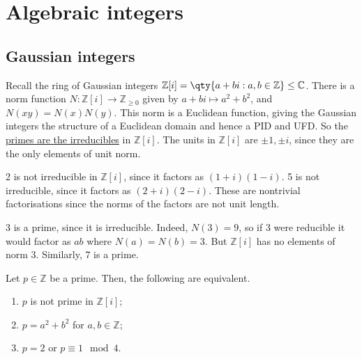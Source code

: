 \section{Algebraic integers}

\subsection{Gaussian integers}
Recall the ring of Gaussian integers $\mathbb Z[i] = \qty{a+bi : a, b \in \mathbb Z} \leq \mathbb C$.
There is a norm function $N : \mathbb Z[i] \to \mathbb Z_{\geq 0}$ given by $a + bi \mapsto a^2 + b^2$, and $N(xy) = N(x) N(y)$.
This norm is a Euclidean function, giving the Gaussian integers the structure of a Euclidean domain and hence a PID and UFD.
So the \underline{primes are the irreducibles} in $\mathbb{Z}[i]$.
The units in $\mathbb Z[i]$ are $\pm 1, \pm i$, since they are the only elements of unit norm.

\begin{example}
	2 is not irreducible in $\mathbb Z[i]$, since it factors as $(1+i)(1-i)$.
	5 is not irreducible, since it factors as $(2+i)(2-i)$.
	These are nontrivial factorisations since the norms of the factors are not unit length.

	3 is a prime, since it is irreducible.
	Indeed, $N(3) = 9$, so if 3 were reducible it would factor as $ab$ where $N(a) = N(b) = 3$.
	But $\mathbb Z[i]$ has no elements of norm 3.
	Similarly, 7 is a prime.
\end{example}

\begin{proposition} \label{prp:12.1}
	Let $p \in \mathbb Z$ be a prime.
	Then, the following are equivalent.
	\begin{enumerate}
		\item $p$ is not prime in $\mathbb Z[i]$;
		\item $p = a^2 + b^2$ for $a, b \in \mathbb Z$;
		\item $p = 2$ or $p \equiv 1 \mod 4$.
	\end{enumerate}
\end{proposition}

